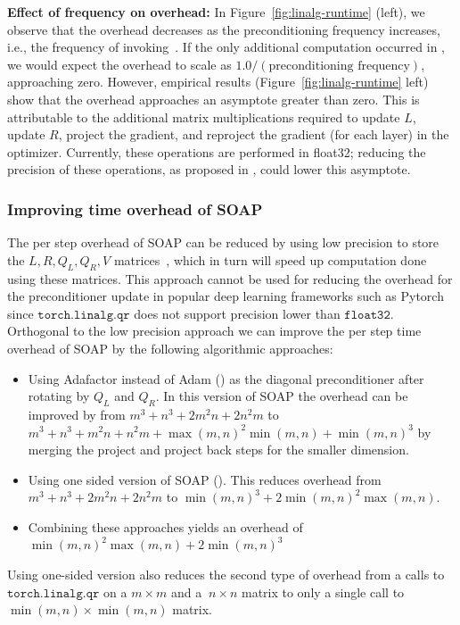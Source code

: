 \documentclass{article} %
\begin{document}
\textbf{Effect of frequency on  overhead:} In Figure~\ref{fig:linalg-runtime}
(left), we observe that the overhead decreases as the preconditioning frequency increases, i.e., the frequency of invoking~. If the only additional computation occurred in , we would expect the overhead to scale as $1.0/(\text{preconditioning frequency})$, approaching zero. However, empirical results (Figure~\ref{fig:linalg-runtime} left) show that the overhead approaches an asymptote greater than zero. This is attributable to the additional matrix multiplications required to update $L$, update $R$, project the gradient, and reproject the gradient (for each layer) in the optimizer. Currently, these operations are performed in float32; reducing the precision of these operations, as proposed in \cite{4bitshampoo}, could lower this asymptote.

\subsubsection{Improving time overhead of SOAP}
\label{app:impr-time}
The per step overhead of SOAP can be reduced by using low precision to store the $L, R, Q_L, Q_R, V$ matrices~\citep{8bitadam,4bitshampoo}, which in turn will speed up computation done using these matrices. This approach cannot be used for reducing the overhead for the preconditioner update in popular deep learning frameworks such as Pytorch since $\texttt{torch.linalg.qr}$ does not support precision lower than $\texttt{float32}$. Orthogonal to the low precision approach we can improve the per step time overhead of SOAP by the following algorithmic approaches:
\begin{itemize}
	\item Using Adafactor instead of Adam () as the diagonal preconditioner after rotating by $Q_L$ and $Q_R$. In this version of SOAP the overhead can be improved by from $m^3+n^3+2m^2n+2n^2m$ to $m^3+n^3+m^2n+n^2m+\max(m, n)^2\min(m, n) + \min(m, n)^3$ by merging the project and project back steps for the smaller dimension.
	\item Using one sided version of SOAP (). This reduces overhead from $m^3+n^3+2m^2n+2n^2m$ to $\min(m, n)^3+2\min(m, n)^2\max(m, n)$. 
	\item Combining these approaches yields an overhead of $\min(m, n)^2\max(m, n)+2 \min(m, n)^3$
\end{itemize} 

Using one-sided version also reduces the second type of overhead from a calls to $\texttt{torch.linalg.qr}$ on a $m \times m$ and a $\ n \times n$ matrix to only a single call to $\min(m, n) \times \min(m, n)$ matrix.
\end{document}

